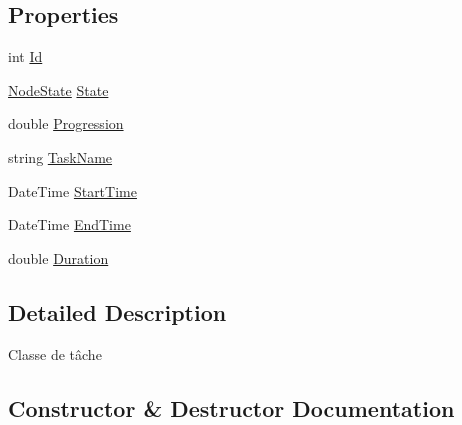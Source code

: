 \subsection*{Properties}
\begin{DoxyCompactItemize}
\item 
int \hyperlink{class_node_net_1_1_tasks_1_1_task_aeecb7dd7f10f7ab0aa875003d0e7435a}{Id}
\item 
\hyperlink{namespace_node_net_1_1_network_1_1_states_a0c130cd0043f8c509dddba2cf1fd2f36}{Node\+State} \hyperlink{class_node_net_1_1_tasks_1_1_task_a65e70a3e233cfebd025653a041e18223}{State}
\item 
double \hyperlink{class_node_net_1_1_tasks_1_1_task_a0795b1f9179937b05cf229c37aab1ae3}{Progression}
\item 
string \hyperlink{class_node_net_1_1_tasks_1_1_task_a4e536f09331796d5560893d725fd3e9c}{Task\+Name}
\item 
Date\+Time \hyperlink{class_node_net_1_1_tasks_1_1_task_a054713ef773fdd7ecdbcb2e671869702}{Start\+Time}
\item 
Date\+Time \hyperlink{class_node_net_1_1_tasks_1_1_task_a6495bc5f6dcfcdc66fb23c6104c454b8}{End\+Time}
\item 
double \hyperlink{class_node_net_1_1_tasks_1_1_task_aee6ef8d9ef2258bf8e21cb7649e6e26e}{Duration}
\end{DoxyCompactItemize}


\subsection{Detailed Description}
Classe de tâche 



\subsection{Constructor \& Destructor Documentation}
\mbox{\label{class_node_net_1_1_tasks_1_1_task_a894afaafcc8404e357ebc1d1ff0c94a5}} 
